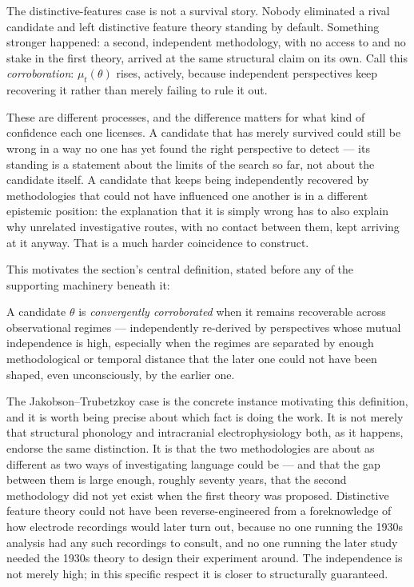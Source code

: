 The distinctive-features case is not a survival story. Nobody eliminated a rival candidate and left distinctive feature theory standing by default. Something stronger happened: a second, independent methodology, with no access to and no stake in the first theory, arrived at the same structural claim on its own. Call this \emph{corroboration}: $\mu_t(\theta)$ rises, actively, because independent perspectives keep recovering it rather than merely failing to rule it out.

These are different processes, and the difference matters for what kind of confidence each one licenses. A candidate that has merely survived could still be wrong in a way no one has yet found the right perspective to detect --- its standing is a statement about the limits of the search so far, not about the candidate itself. A candidate that keeps being independently recovered by methodologies that could not have influenced one another is in a different epistemic position: the explanation that it is simply wrong has to also explain why unrelated investigative routes, with no contact between them, kept arriving at it anyway. That is a much harder coincidence to construct.

This motivates the section's central definition, stated before any of the supporting machinery beneath it:

\begin{definition}
A candidate $\theta$ is \emph{convergently corroborated} when it remains recoverable across observational regimes --- independently re-derived by perspectives whose mutual independence is high, especially when the regimes are separated by enough methodological or temporal distance that the later one could not have been shaped, even unconsciously, by the earlier one.
\end{definition}

The Jakobson--Trubetzkoy case is the concrete instance motivating this definition, and it is worth being precise about which fact is doing the work. It is not merely that structural phonology and intracranial electrophysiology both, as it happens, endorse the same distinction. It is that the two methodologies are about as different as two ways of investigating language could be --- and that the gap between them is large enough, roughly seventy years, that the second methodology did not yet exist when the first theory was proposed. Distinctive feature theory could not have been reverse-engineered from a foreknowledge of how electrode recordings would later turn out, because no one running the 1930s analysis had any such recordings to consult, and no one running the later study needed the 1930s theory to design their experiment around. The independence is not merely high; in this specific respect it is closer to structurally guaranteed.


